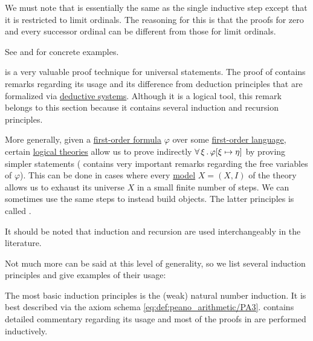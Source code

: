 \begin{remark}
  We must note that  is essentially the same as the single inductive step  except that it is restricted to limit ordinals. The reasoning for this is that the proofs for zero and every successor ordinal can be different from those for limit ordinals.

  See  and  for concrete examples.
\end{remark}

\begin{remark}\label{rem:induction}
   is a very valuable proof technique for universal statements. The proof of  contains remarks regarding its usage and its difference from deduction principles that are formalized via \hyperref[def:deductive_system]{deductive systems}. Although it is a logical tool, this remark belongs to this section because it contains several induction and recursion principles.

  More generally, given a \hyperref[def:first_order_syntax/formula]{first-order formula} \( \varphi \) over some \hyperref[def:first_order_language]{first-order language}, certain \hyperref[def:first_order_theory]{logical theories} allow us to prove indirectly \( \forall \thinspace \xi \thinspace . \thinspace \varphi[\xi \mapsto \eta] \) by proving simpler statements ( contains very important remarks regarding the free variables of \( \varphi \)). This can be done in cases where every \hyperref[def:first_order_model]{model} \( X = (X, I) \) of the theory allows us to exhaust its universe \( X \) in a small finite number of steps. We can sometimes use the same steps to instead build objects. The latter principles is called .

  It should be noted that induction and recursion are used interchangeably in the literature.

  Not much more can be said at this level of generality, so we list several induction principles and give examples of their usage:
  \begin{thmenum}
     The most basic induction principles is the (weak) natural number induction. It is best described via the axiom schema \eqref{eq:def:peano_arithmetic/PA3}.  contains detailed commentary regarding its usage and most of the proofs in  are performed inductively.


\end{thmenum}
\end{remark}
